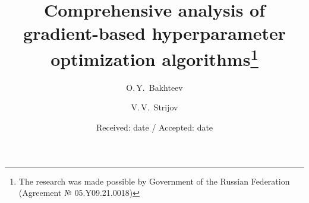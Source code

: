 \documentclass[smallextended]{svjour3}
\begin{document}




\title{Comprehensive analysis of gradient-based hyperparameter optimization algorithms\thanks{The research was made possible by Government of the Russian Federation (Agreement № 05.Y09.21.0018)}}%

\author{O.\,Y.~Bakhteev        \and
        V.\,V.~Strijov %
}


\date{Received: date / Accepted: date}


\maketitle




\end{document}
